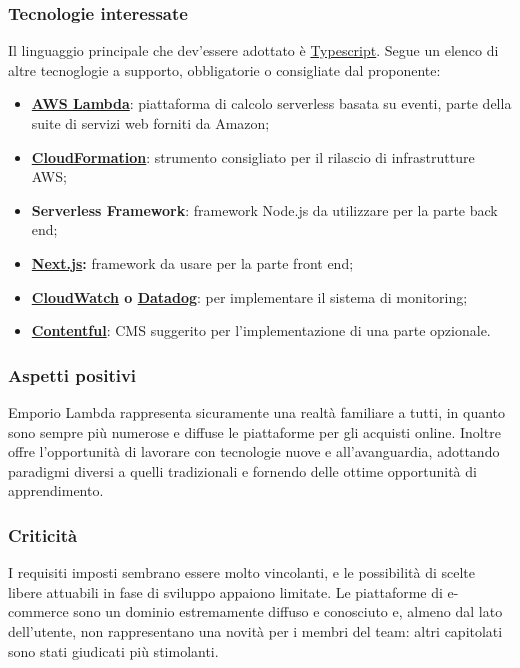 \subsubsection{Tecnologie interessate}

Il linguaggio principale che dev'essere adottato è \href{https://www.typescriptlang.org/}{Typescript}. Segue un elenco di altre tecnoglogie a supporto, obbligatorie o consigliate dal proponente:
\begin{itemize}
    \item \textbf{\href{https://aws.amazon.com/it/lambda/}{AWS Lambda}}: piattaforma di calcolo serverless basata su eventi, parte della suite di servizi web forniti da Amazon;
    \item \textbf{\href{https://aws.amazon.com/it/cloudformation/}{CloudFormation}}: strumento consigliato per il rilascio di infrastrutture AWS;
    \item \textbf{Serverless Framework}: framework Node.js da utilizzare per la parte back end;
    \item \textbf{\href{https://nextjs.org/}{Next.js}:} framework da usare per la parte front end;
    \item \textbf{\href{https://aws.amazon.com/it/cloudwatch/}{CloudWatch} o \href{https://www.datadoghq.com/}{Datadog}}: per implementare il sistema di monitoring;
    \item \textbf{\href{https://www.contentful.com/}{Contentful}}: CMS suggerito per l'implementazione di una parte opzionale.
\end{itemize}


\subsubsection{Aspetti positivi}

Emporio Lambda rappresenta sicuramente una realtà familiare a tutti, in quanto sono sempre più numerose e diffuse le piattaforme per gli acquisti online. Inoltre offre l'opportunità di lavorare con tecnologie nuove e all'avanguardia, adottando paradigmi diversi a quelli tradizionali e fornendo delle ottime opportunità di apprendimento.


\subsubsection{Criticità}

I requisiti imposti sembrano essere molto vincolanti, e le possibilità di scelte libere attuabili in fase di sviluppo appaiono limitate. Le piattaforme di e-commerce sono un dominio estremamente diffuso e conosciuto e, almeno dal lato dell'utente, non rappresentano una novità per i membri del team: altri capitolati sono stati giudicati più stimolanti.


